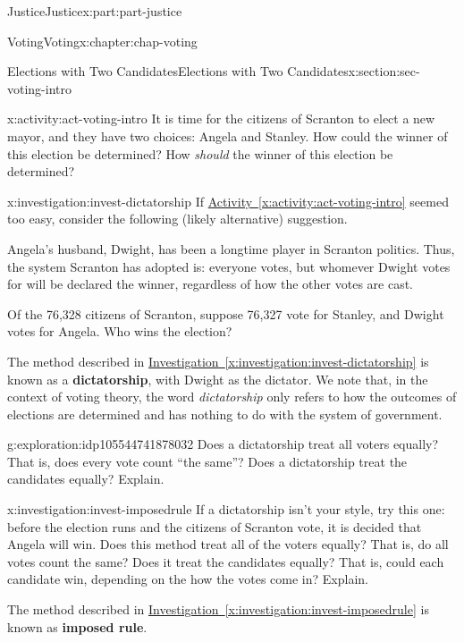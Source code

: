\documentclass[oneside,10pt,]{book}
\newcommand{\xreffont}{\relax}
\newcommand{\terminology}[1]{\textbf{#1}}
\numberwithin{equation}{section}
\begin{document}
\begin{partptx}{Justice}{}{Justice}{}{}{x:part:part-justice}
\begin{chapterptx}{Voting}{}{Voting}{}{}{x:chapter:chap-voting}
\begin{sectionptx}{Elections with Two Candidates}{}{Elections with Two Candidates}{}{}{x:section:sec-voting-intro}
\begin{introduction}{}
\end{introduction}%
\begin{activity}{}{x:activity:act-voting-intro}%
It is time for the citizens of Scranton to elect a new mayor, and they have two choices: Angela and Stanley. How could the winner of this election be determined? How \emph{should} the winner of this election be determined?%
\end{activity}%
\begin{investigation}{}{x:investigation:invest-dictatorship}%
If \hyperref[x:activity:act-voting-intro]{Activity~{\xreffont\ref{x:activity:act-voting-intro}}} seemed too easy, consider the following (likely alternative) suggestion.%
\par
Angela's husband, Dwight, has been a longtime player in Scranton politics. Thus, the system Scranton has adopted is: everyone votes, but whomever Dwight votes for will be declared the winner, regardless of how the other votes are cast.%
\par
Of the 76,328 citizens of Scranton, suppose 76,327 vote for Stanley, and Dwight votes for Angela. Who wins the election?%
\end{investigation}%
The method described in \hyperref[x:investigation:invest-dictatorship]{Investigation~{\xreffont\ref{x:investigation:invest-dictatorship}}} is known as a \terminology{dictatorship}, with Dwight as the dictator. We note that, in the context of voting theory, the word \emph{dictatorship} only refers to how the outcomes of elections are determined and has nothing to do with the system of government.%
\begin{exploration}{}{g:exploration:idp105544741878032}%
Does a dictatorship treat all voters equally? That is, does every vote count ``the same''? Does a dictatorship treat the candidates equally? Explain.%
\end{exploration}%
\begin{investigation}{}{x:investigation:invest-imposedrule}%
If a dictatorship isn't your style, try this one: before the election runs and the citizens of Scranton vote, it is decided that Angela will win. Does this method treat all of the voters equally? That is, do all votes count the same? Does it treat the candidates equally? That is, could each candidate win, depending on the how the votes come in? Explain.%
\end{investigation}%
The method described in \hyperref[x:investigation:invest-imposedrule]{Investigation~{\xreffont\ref{x:investigation:invest-imposedrule}}} is known as \terminology{imposed rule}.%

\end{sectionptx}
\end{chapterptx}
\end{partptx}
\end{document}
